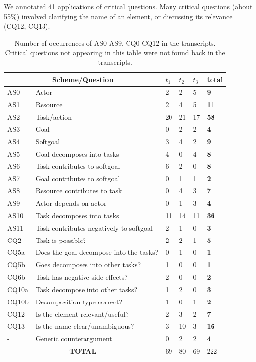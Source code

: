 We annotated 41 applications of critical questions. Many critical questions (about 55\%) involved clarifying the name of an element, or discussing its relevance (CQ12, CQ13).

\begin{table}[ht]
\centering
\begin{tabularx}{0.5\textwidth}{|l|X|l|l|l|>{\bfseries}l|}
\hline
\multicolumn{2}{|c|}{\textbf{Scheme/Question}} & $t_1$ & $t_2$ & $t_3$ & \textbf{total}\\
\hline 
AS0 & Actor & 2 & 2 & 5 & 9\\
\hline
AS1 & Resource & 2 & 4 & 5 & 11\\
\hline
AS2 & Task/action & 20 & 21 & 17 & 58\\
\hline
AS3 & Goal & 0 & 2 & 2 & 4\\
\hline
AS4 & Softgoal & 3 & 4 & 2 & 9\\
\hline
AS5 & Goal decomposes into tasks & 4 &0& 4 & 8\\
\hline
AS6 & Task contributes to softgoal & 6 & 2 &0& 8\\
\hline
AS7 & Goal contributes to softgoal &0& 1 & 1 & 2\\
\hline
AS8 & Resource contributes to task & 0 & 4 & 3 & 7\\
\hline
AS9 & Actor depends on actor &0& 1 & 3 & 4\\
\hline
AS10 & Task decomposes into tasks & 11 &14 &11 &36\\ 
\hline
AS11 & Task contributes negatively to softgoal & 2 & 1 & 0 & 3\\
\hline
\hline
CQ2 & Task is possible? & 2 & 2 & 1 & 5\\
\hline		
CQ5a & Does the goal decompose into the tasks? & 0 & 1 & 0 & 1\\
\hline
CQ5b & Goes decomposes into other tasks? & 1 & 0 & 0 & 1\\
\hline
CQ6b & Task has negative side effects? & 2 & 0 & 0 & 2\\
\hline
CQ10a & Task decompose into other tasks? & 1 &2 &0&3\\
\hline
CQ10b & Decomposition type correct? &1 &0& 1 &2\\
\hline
\hline
CQ12 & Is the element relevant/useful? & 2 & 3 & 2 &7\\
\hline
CQ13 & Is the name clear/unambiguous? &3 &10 & 3 & 16\\
\hline
\hline
- & Generic counterargument & 0& 2 & 2 & 4\\
\hline
\hline
\multicolumn{2}{|c|}{\textbf{TOTAL}}&69&80&69&222\\
\hline
\end{tabularx}
\caption{Number of occurrences of AS0-AS9, CQ0-CQ12 in the transcripts. Critical questions not appearing in this table were not found back in the transcripts.}
\label{table:transcripts:results:argumentschemes}
\end{table}

